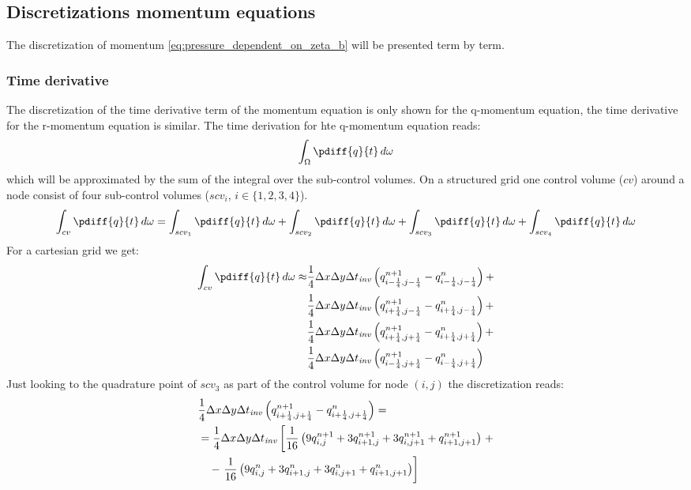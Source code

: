 \subsection{Discretizations momentum equations}
The discretization of momentum \autoref{eq:pressure_dependent_on_zeta_b} will be presented term by term.
\subsubsection{Time derivative}
The discretization of the time derivative term of the momentum equation is only shown for the q-momentum equation, the time derivative for the r-momentum equation is similar. The time derivation for hte q-momentum equation reads:
\begin{align}
    \int_{\Omega} \pdiff{q}{t}\, d\omega
\end{align}
which will be approximated by the sum of the integral over the sub-control volumes.
On a structured grid one control volume ($cv$) around a node consist of four sub-control volumes ($scv_i$, $i\in\{1,2,3,4\}$).
\begin{align}
    \int_{cv} \pdiff{q}{t}\, d\omega =
    \int_{scv_1} \pdiff{q}{t}\, d\omega +
    \int_{scv_2} \pdiff{q}{t}\, d\omega +
    \int_{scv_3} \pdiff{q}{t}\, d\omega +
    \int_{scv_4} \pdiff{q}{t}\, d\omega
\end{align}
For a cartesian grid we get:
\begin{align}
    \int_{cv} \pdiff{q}{t}\, d\omega \approx &
    \quart\Dx\Dy\Dtinv \left( q^{n+1}_{i-\quart, j-\quart} -  q^{n}_{i-\quart, j-\quart} \right) +
    \nonumber \\*
    &\quart\Dx\Dy\Dtinv \left( q^{n+1}_{i+\quart, j-\quart} -  q^{n}_{i+\quart, j-\quart} \right) +
    \nonumber \\*
    &\quart\Dx\Dy\Dtinv \left( q^{n+1}_{i+\quart, j+\quart} -  q^{n}_{i+\quart, j+\quart} \right) +
    \nonumber \\*
    &\quart\Dx\Dy\Dtinv \left( q^{n+1}_{i-\quart, j+\quart} -  q^{n}_{i-\quart, j+\quart} \right)
\end{align}
Just looking to the quadrature point of $scv_3$ as part of the control volume for node $(i,j)$ the discretization reads:
\begin{align}
    &\frac{1}{4}\Delta x\Delta y\Delta t_{\it{inv}} \left( q^{n+1}_{i+\frac{1}{4}, j+\frac{1}{4}} -  q^{n}_{i+\frac{1}{4}, j+\frac{1}{4}} \right) =
    \nonumber \\*
    &= \frac{1}{4}\Delta x\Delta y\Delta t_{\it{inv}} \left[ \frac{1}{16}\left( 9 q^{n+1}_{i, j} + 3 q^{n+1}_{i+1,j}  + 3 q^{n+1}_{i, j+1} + q^{n+1}_{i+1, j+1}\right) \right. +
    \nonumber\\*
    &\quad - \left. \frac{1}{16}\left( 9 q^{n}_{i, j} +  3 q^{n}_{i+1,j}  + 3  q^{n}_{i, j+1} + q^{n}_{i+1, j+1}\right)\right]
\end{align}
